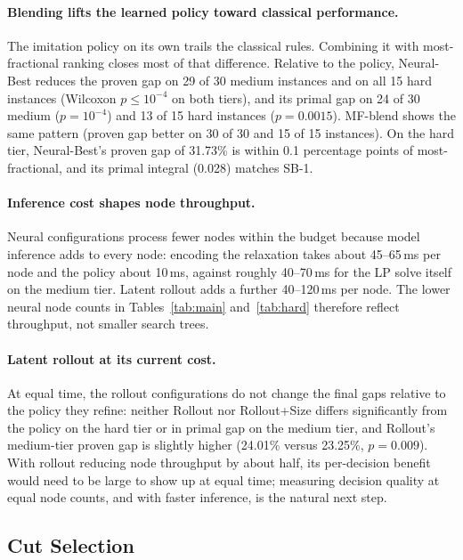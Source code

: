 \documentclass[11pt,a4paper]{article}
\begin{document}
\paragraph{Blending lifts the learned policy toward classical performance.}
The imitation policy on its own trails the classical rules. Combining it with most-fractional ranking closes most of that difference. Relative to the policy, Neural-Best reduces the proven gap on 29 of 30 medium instances and on all 15 hard instances (Wilcoxon $p\le 10^{-4}$ on both tiers), and its primal gap on 24 of 30 medium ($p=10^{-4}$) and 13 of 15 hard instances ($p=0.0015$). MF-blend shows the same pattern (proven gap better on 30 of 30 and 15 of 15 instances). On the hard tier, Neural-Best's proven gap of 31.73\% is within 0.1 percentage points of most-fractional, and its primal integral (0.028) matches SB-1.

\paragraph{Inference cost shapes node throughput.}
Neural configurations process fewer nodes within the budget because model inference adds to every node: encoding the relaxation takes about 45--65\,ms per node and the policy about 10\,ms, against roughly 40--70\,ms for the LP solve itself on the medium tier. Latent rollout adds a further 40--120\,ms per node. The lower neural node counts in Tables~\ref{tab:main} and~\ref{tab:hard} therefore reflect throughput, not smaller search trees.

\paragraph{Latent rollout at its current cost.}
At equal time, the rollout configurations do not change the final gaps relative to the policy they refine: neither Rollout nor Rollout+Size differs significantly from the policy on the hard tier or in primal gap on the medium tier, and Rollout's medium-tier proven gap is slightly higher (24.01\% versus 23.25\%, $p=0.009$). With rollout reducing node throughput by about half, its per-decision benefit would need to be large to show up at equal time; measuring decision quality at equal node counts, and with faster inference, is the natural next step.

\subsection{Cut Selection}
\end{document}
